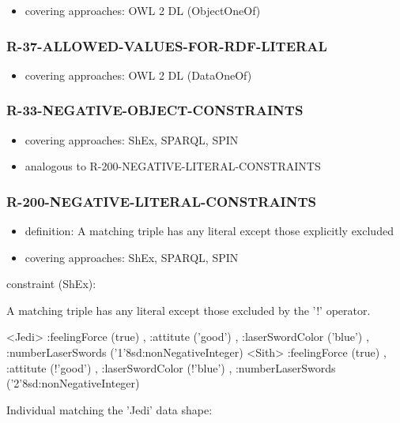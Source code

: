 \documentclass{llncs}
\begin{document}
\begin{itemize}
	\item covering approaches:  OWL 2 DL (ObjectOneOf) 
\end{itemize}

\subsubsection{R-37-ALLOWED-VALUES-FOR-RDF-LITERAL}

\begin{itemize}
	\item covering approaches:  OWL 2 DL (DataOneOf) 
\end{itemize}

\subsubsection{R-33-NEGATIVE-OBJECT-CONSTRAINTS}

\begin{itemize}
	\item covering approaches:  ShEx, SPARQL, SPIN
	\item analogous to R-200-NEGATIVE-LITERAL-CONSTRAINTS
\end{itemize}

\subsubsection{R-200-NEGATIVE-LITERAL-CONSTRAINTS}

\begin{itemize}
	\item definition: A matching triple has any literal except those explicitly excluded
	\item covering approaches:  ShEx, SPARQL, SPIN
\end{itemize}

constraint (ShEx):

A matching triple has any literal except those excluded by the '!' operator.

\begin{ex}
<Jedi> {
    :feelingForce (true) ,
    :attitute ('good') ,
    :laserSwordColor ('blue') ,
    :numberLaserSwords ('1'^^xsd:nonNegativeInteger) }
<Sith> {
    :feelingForce (true) ,
    :attitute (!'good') ,
    :laserSwordColor (!'blue') ,
    :numberLaserSwords ('2'^^xsd:nonNegativeInteger) }
\end{ex}

Individual matching the 'Jedi' data shape:
\end{document}
